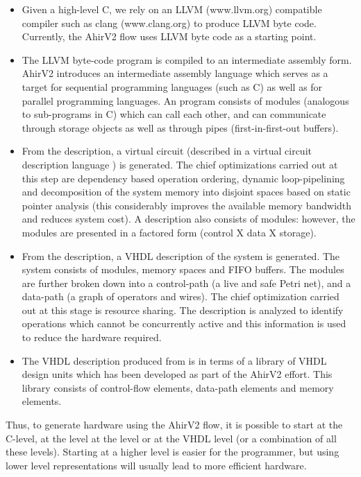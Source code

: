 \begin{itemize}
\item Given a high-level C, we rely on
an LLVM (www.llvm.org) compatible compiler such as clang (www.clang.org)
to produce LLVM byte code.
Currently, the AhirV2 flow uses LLVM byte code as a starting point.
\item The LLVM byte-code program is compiled
to an intermediate assembly form.  AhirV2
introduces an intermediate assembly language
\Aa  which serves as a target for sequential
programming languages (such as C) as
well as for parallel programming languages.
An \Aa program consists of modules (analogous
to sub-programs in C) which can call each 
other, and can communicate through storage objects
as well as through pipes (first-in-first-out buffers).
\item From the \Aa description, a virtual
circuit (described in a virtual circuit
description language \vC) is generated.
The chief optimizations carried out at this
step are dependency based operation
ordering, dynamic loop-pipelining and decomposition of the system memory
into disjoint spaces based on static pointer
analysis (this considerably improves the
available memory bandwidth and reduces
system cost).  A \vC description also
consists of modules: however, the modules
are presented in a factored form (control X data X storage).
\item From the \vC description, a
VHDL description of the system is generated.
The system consists of modules, memory spaces
and FIFO buffers.  The modules are further
broken down into a control-path (a live and safe
Petri net), and a data-path (a graph of operators
and wires).
The chief optimization carried out at this
stage is resource sharing.  The \vC description
is analyzed to identify operations which
cannot be concurrently active and this information
is used to reduce the hardware required.
\item 
The VHDL description produced from 
\vC is in terms of a library
of VHDL design units which has been developed
as part of the AhirV2  effort.  This library
consists of control-flow elements, data-path
elements and memory elements.
\end{itemize}

Thus, to generate hardware using the AhirV2 flow,
it is possible to start at the C-level, at the \Aa level
at the \vC level or at the VHDL level (or a combination
of all these levels).  Starting at a higher level is
easier for the programmer, but using lower level representations
will usually lead to more efficient hardware.

